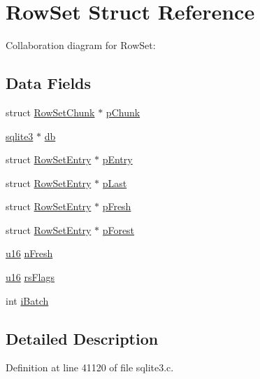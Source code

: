 \hypertarget{struct_row_set}{}\section{Row\+Set Struct Reference}
\label{struct_row_set}


Collaboration diagram for Row\+Set\+:
\subsection*{Data Fields}
\begin{DoxyCompactItemize}
\item 
struct \hyperlink{struct_row_set_chunk}{Row\+Set\+Chunk} $\ast$ \hyperlink{struct_row_set_a1f15b1b441943e874ed1f8fa1ef56c06}{p\+Chunk}
\item 
\hyperlink{structsqlite3}{sqlite3} $\ast$ \hyperlink{struct_row_set_ad6e663497d2c934364b3bcf07496b30b}{db}
\item 
struct \hyperlink{struct_row_set_entry}{Row\+Set\+Entry} $\ast$ \hyperlink{struct_row_set_aa89a683366c2e9acf50c9f25acee175b}{p\+Entry}
\item 
struct \hyperlink{struct_row_set_entry}{Row\+Set\+Entry} $\ast$ \hyperlink{struct_row_set_a55f1d815d176ed58e160a1af1203442c}{p\+Last}
\item 
struct \hyperlink{struct_row_set_entry}{Row\+Set\+Entry} $\ast$ \hyperlink{struct_row_set_af197f8fa85fa1582df97f18e243cb666}{p\+Fresh}
\item 
struct \hyperlink{struct_row_set_entry}{Row\+Set\+Entry} $\ast$ \hyperlink{struct_row_set_ac18827ae3e7b5bda6e89256c5f551165}{p\+Forest}
\item 
\hyperlink{sqlite3_8c_a20f2299e322dcbde37cb07b16910b843}{u16} \hyperlink{struct_row_set_ac060d7edf593aa52dd662cfc33ca6631}{n\+Fresh}
\item 
\hyperlink{sqlite3_8c_a20f2299e322dcbde37cb07b16910b843}{u16} \hyperlink{struct_row_set_a54c0ccbe4d32bd0d5979e62d94956106}{rs\+Flags}
\item 
int \hyperlink{struct_row_set_a470e1d1ac2d44a676f33079ebb476813}{i\+Batch}
\end{DoxyCompactItemize}


\subsection{Detailed Description}


Definition at line 41120 of file sqlite3.\+c.



